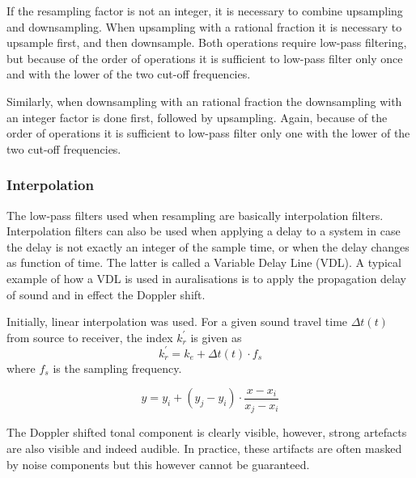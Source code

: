 If the resampling factor is not an integer, it is necessary to combine
upsampling and downsampling. When upsampling with a rational fraction it is
necessary to upsample first, and then downsample. Both operations require
low-pass filtering, but because of the order of operations it is sufficient to
low-pass filter only once and with the lower of the two cut-off frequencies.

Similarly, when downsampling with an rational fraction the downsampling with an
integer factor is done first, followed by upsampling. Again, because of the
order of operations it is sufficient to low-pass filter only one with the lower
of the two cut-off frequencies.

\subsubsection{Interpolation}
The low-pass filters used when resampling are basically interpolation filters.
Interpolation filters can also be used when applying a delay to a system in case
the delay is not exactly an integer of the sample time, or when the delay
changes as function of time. The latter is called a Variable Delay Line (VDL). A
typical example of how a VDL is used in auralisations is to apply the
propagation delay of sound and in effect the Doppler shift.



Initially, linear interpolation was used.
For a given sound travel time $\Delta t(t)$ from source to receiver, the index
$k_{r}^{'}$ is given as
\begin{equation}
 k_{r}^{'} = k_e + \Delta t (t) \cdot f_s
\end{equation}
where $f_s$ is the sampling frequency.


\begin{equation}
 y = y_i + (y_j-y_i) \cdot \frac{x-x_i}{x_j-x_i}
\end{equation}


The Doppler shifted tonal component is clearly visible, however, strong artefacts are also visible and indeed audible.
In practice, these artifacts are often masked by noise components but this however cannot be guaranteed.

